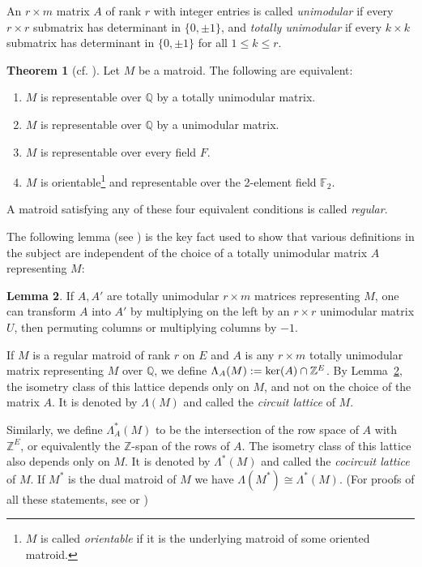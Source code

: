 \documentclass[12pt]{amsart}
\newcommand{\FF}{\mathbb{F}}
\newcommand{\QQ}{\mathbb{Q}}
\newcommand{\ZZ}{\mathbb{Z}}
\numberwithin{equation}{section}
\theoremstyle{definition}
\newtheorem{theorem}{Theorem}[subsection]
\newtheorem{lemma}[theorem]{Lemma}
\begin{document}
An $r \times m$ matrix $A$ of rank $r$ with integer entries is called {\em unimodular} if every $r \times r$ submatrix has determinant in $\{ 0, \pm 1 \}$, and {\em totally unimodular} if every $k \times k$ submatrix has determinant in $\{ 0, \pm 1 \}$ for all $1 \leq k \leq r$.

\begin{theorem}[{cf. \cite[Theorem~3.1.1]{white1987combinatorial}}] 
Let $M$ be a matroid.  The following are equivalent:
\begin{enumerate}
\item $M$ is representable over $\QQ$ by a totally unimodular matrix.
\item $M$ is representable over $\QQ$ by a unimodular matrix.
\item $M$ is representable over every field $F$.
\item $M$ is orientable\footnote{$M$ is called {\em orientable} if it is the underlying matroid of some oriented matroid.} and representable over the 2-element field $\FF_2$.

\end{enumerate}
A matroid satisfying any of these four equivalent conditions is called {\em regular}.
\end{theorem}



The following lemma (see \cite[Corollary 10.1.4]{oxley2006matroid}) is the key fact used to show that various definitions in the subject are independent of the choice of a totally unimodular matrix $A$ representing $M$:

\begin{lemma} \label{lem:transformation}
If $A,A'$ are totally unimodular $r \times m$ matrices representing $M$, one can transform $A$ into $A'$ by multiplying on the left by an $r \times r$ unimodular matrix $U$, then permuting columns or multiplying columns by $-1$.  
\end{lemma}

\medskip

If $M$ is a regular matroid of rank $r$ on $E$ and $A$ is any $r \times m$ totally unimodular matrix representing $M$ over $\QQ$, we define
$\Lambda_A(M) := {\rm ker}(A) \cap \ZZ^E$.  By Lemma~\ref{lem:transformation}, the isometry class of this lattice depends only on $M$, and not on the choice of the matrix $A$.  It is denoted by $\Lambda(M)$ and called the {\em circuit lattice} of $M$.

Similarly, we define $\Lambda^*_A(M)$ to be the intersection of the row space of $A$ with $\ZZ^E$, or equivalently the $\ZZ$-span of the rows of $A$.
The isometry class of this lattice also depends only on $M$.  It is denoted by $\Lambda^*(M)$ and called the {\em cocircuit lattice} of $M$.
If $M^*$ is the dual matroid of $M$ we have $\Lambda(M^*) \cong \Lambda^*(M)$.
(For proofs of all these statements, see \cite[\S{4.3}]{merino1999matroids} or \cite[\S{2.3}]{su2010lattice})
\end{document}
